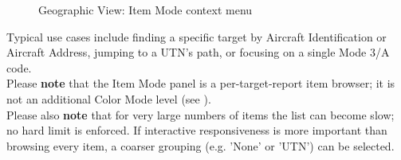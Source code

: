 \begin{figure}[H]
  \centering
  \caption{Geographic View: Item Mode context menu}
\end{figure}

Typical use cases include finding a specific target by Aircraft Identification or Aircraft Address, jumping to a UTN's path, or focusing on a single Mode 3/A code. \\

Please \textbf{note} that the Item Mode panel is a per-target-report item browser; it is not an additional Color Mode level (see ). \\

Please also \textbf{note} that for very large numbers of items the list can become slow; no hard limit is enforced. If interactive responsiveness is more important than browsing every item, a coarser grouping (e.g. 'None' or 'UTN') can be selected.
